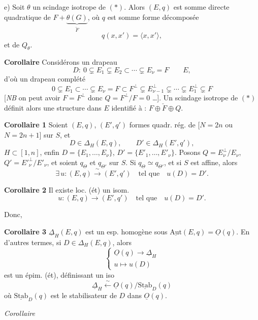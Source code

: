 \documentclass[11pt,a4paper]{article}
\begin{document}
e) Soit $\theta$ un scindage isotrope de $(*)$. Alors $(E,q)$ est somme directe
quadratique de $F+\underbrace{\theta(G)}_{\check F}$,  où $q$ est somme
forme décomposée
\[
q(x,x') = \langle x,x'\rangle ,
\]
et de $Q_\theta$.

\textbf{Corollaire} Considérons un drapeau
\[
D :\ 0 \subsetneq E_1 \subsetneq E_2 \subset\cdots\subsetneq E_\nu = F \qquad E ,
\]
d'où un drapeau complété
\[
0\subsetneq E_1 \subset\cdots\subsetneq E_\nu = F \subset F^{\perp} \subsetneq E_{\nu-1}^{\perp} \subsetneq\cdots\subsetneq E_1^{\perp} \subsetneq F
\]
[\emph{NB} on peut avoir $F=F^{\perp}$ donc $Q=F^{\perp}/F=0$ …]. Un
scindage isotrope de $(*)$ définit alors une structure  dans
$E$ identifié à : $F\oplus\check F\oplus Q$.

\textbf{Corollaire 1} Soient $(E,q)$, $(E',q')$ formes quadr. rég. de
 [$N=2n$ ou $N=2n+1$] sur $S$,  et
\[
D\in\Delta_H(E,q),\qquad D'\in\Delta_H(E',q') ,
\]
$H\subset[1,n]$, enfin $D=\{E_1,\ldots,E_\nu\}$, $D'=\{E'_1,\ldots,E'_\nu\}$.
 Posons $Q=E_\nu^{\perp}/E_\nu$,
$Q'=E'^{\perp}_\nu/E'_\nu$, et soient $q_\Theta$ et $q_{\Theta'}$
\ill{} \ill{} \ill{} \ill{} sur $S$. Si $q_\Theta\simeq q_{\Theta'}$,
 et si $S$ est affine, alors
\struck{\ill{}}
\[
\exists\, u : (E,q) \xrightarrow{\ \sim\ } (E',q') \quad\text{tel que}\quad u(D)=D' .
\]

\textbf{Corollaire 2} Il existe loc. (ét) un isom.
\[
u : (E,q) \longrightarrow (E',q') \quad\text{tel que}\quad u(D)=D' .
\]

Donc,

\textbf{Corollaire 3} $\underline{\Delta}_H(E,q)$ est un esp. homogène
 sous $\underline{\mathrm{Aut}}(E,q)=\underline{O}(q)$. En d'autres
termes, si $D\in\Delta_H(E,q)$, alors
\[
\begin{cases}
\underline{O}(q) \longrightarrow \underline{\Delta}_H \\
u \longmapsto u(D)
\end{cases}
\]
est un épim. (ét),  définissant un iso
\[
\underline{\Delta}_H \xleftarrow{\ \sim\ } \underline{O}(q)/\underline{\mathrm{Stab}}_D(q)
\]
où $\underline{\mathrm{Stab}}_D(q)$ est le stabilisateur de $D$ dans $\underline{O}(q)$.

\emph{Corollaire}
\end{document}
